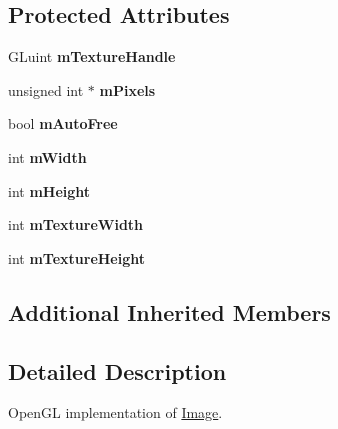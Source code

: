 \subsection*{Protected Attributes}
\begin{DoxyCompactItemize}
\item 
G\+Luint {\bfseries m\+Texture\+Handle}\hypertarget{classgcn_1_1OpenGLImage_ab6bbf43a336fd3637225ccb16a6590f1}{}\label{classgcn_1_1OpenGLImage_ab6bbf43a336fd3637225ccb16a6590f1}

\item 
unsigned int $\ast$ {\bfseries m\+Pixels}\hypertarget{classgcn_1_1OpenGLImage_a9556fb357d35fb1263f5c890fa678bdf}{}\label{classgcn_1_1OpenGLImage_a9556fb357d35fb1263f5c890fa678bdf}

\item 
bool {\bfseries m\+Auto\+Free}\hypertarget{classgcn_1_1OpenGLImage_ab8505b0f5f7621dbd5a0cf1ae4782bb7}{}\label{classgcn_1_1OpenGLImage_ab8505b0f5f7621dbd5a0cf1ae4782bb7}

\item 
int {\bfseries m\+Width}\hypertarget{classgcn_1_1OpenGLImage_a975f80c913f48cb445a24e7fd831c998}{}\label{classgcn_1_1OpenGLImage_a975f80c913f48cb445a24e7fd831c998}

\item 
int {\bfseries m\+Height}\hypertarget{classgcn_1_1OpenGLImage_ab3e2204b80f8b9aad34582c837f67f83}{}\label{classgcn_1_1OpenGLImage_ab3e2204b80f8b9aad34582c837f67f83}

\item 
int {\bfseries m\+Texture\+Width}\hypertarget{classgcn_1_1OpenGLImage_ac60ab59f46dee4c5fd0b8b9b48f6c210}{}\label{classgcn_1_1OpenGLImage_ac60ab59f46dee4c5fd0b8b9b48f6c210}

\item 
int {\bfseries m\+Texture\+Height}\hypertarget{classgcn_1_1OpenGLImage_a5b8af012033ef0f8afe75f71c90dd70c}{}\label{classgcn_1_1OpenGLImage_a5b8af012033ef0f8afe75f71c90dd70c}

\end{DoxyCompactItemize}
\subsection*{Additional Inherited Members}


\subsection{Detailed Description}
Open\+GL implementation of \hyperlink{classgcn_1_1Image}{Image}. 

